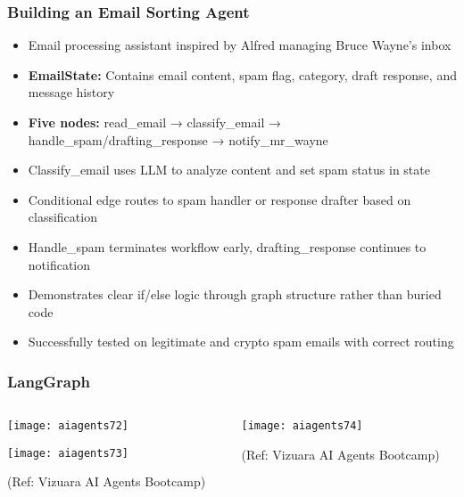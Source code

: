 \begin{frame}[fragile]\frametitle{Building an Email Sorting Agent}

      \begin{itemize}
        \item Email processing assistant inspired by Alfred managing Bruce Wayne's inbox
        \item \textbf{EmailState:} Contains email content, spam flag, category, draft response, and message history
        \item \textbf{Five nodes:} read\_email → classify\_email → handle\_spam/drafting\_response → notify\_mr\_wayne
        \item Classify\_email uses LLM to analyze content and set spam status in state
        \item Conditional edge routes to spam handler or response drafter based on classification
        \item Handle\_spam terminates workflow early, drafting\_response continues to notification
        \item Demonstrates clear if/else logic through graph structure rather than buried code
        \item Successfully tested on legitimate and crypto spam emails with correct routing
      \end{itemize}

\end{frame}

\begin{frame}[fragile]\frametitle{LangGraph}
\begin{columns}
    \begin{column}[T]{0.5\linewidth}
        \begin{center}
	
        \texttt{[image: aiagents72]}
	
        \texttt{[image: aiagents73]}
		
		{\tiny (Ref: Vizuara AI Agents Bootcamp)}
				
        \end{center}    
    \end{column}
    \begin{column}[T]{0.5\linewidth}
        \begin{center}

        \texttt{[image: aiagents74]}
		
		{\tiny (Ref: Vizuara AI Agents Bootcamp)}
				
        \end{center}    
    \end{column}
  \end{columns}
\end{frame}

